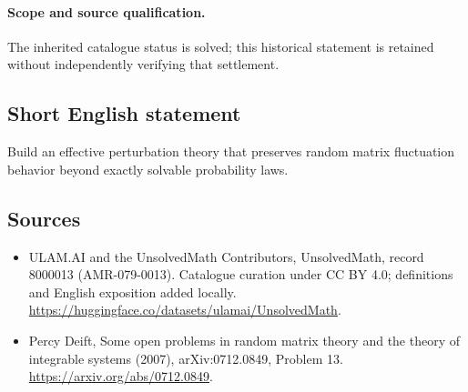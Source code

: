 \documentclass[11pt]{article}
\begin{document}
\paragraph{Scope and source qualification.}The inherited catalogue status is solved; this historical statement is retained without independently verifying that settlement.
\subsection{Short English statement}
Build an effective perturbation theory that preserves random matrix fluctuation behavior beyond exactly solvable probability laws.
\subsection{Sources}
\begin{itemize}
\item[\hypertarget{source:8000013:1}{S1}] ULAM.AI and the UnsolvedMath Contributors, UnsolvedMath, record 8000013 (AMR-079-0013). Catalogue curation under CC BY 4.0; definitions and English exposition added locally.
\url{https://huggingface.co/datasets/ulamai/UnsolvedMath}.
\item[\hypertarget{source:8000013:2}{S2}] Percy Deift, Some open problems in random matrix theory and the theory of integrable systems (2007), arXiv:0712.0849, Problem 13.
\url{https://arxiv.org/abs/0712.0849}.
\end{itemize}
\label{end:8000013}
\end{document}
